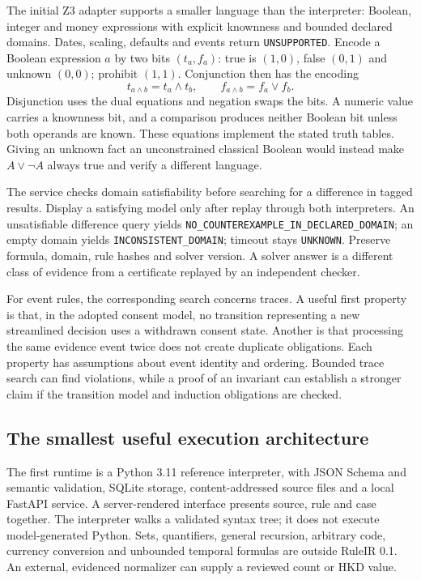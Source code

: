 The initial Z3 adapter supports a smaller language than the interpreter:
Boolean, integer and money expressions with explicit knownness and bounded
declared domains. Dates, scaling, defaults and events return
\texttt{UNSUPPORTED}. Encode a Boolean expression $a$ by two bits $(t_a,f_a)$:
true is $(1,0)$, false $(0,1)$ and unknown $(0,0)$; prohibit $(1,1)$.
Conjunction then has the encoding
\begin{equation}
 t_{a\land b}=t_a\land t_b,\qquad
 f_{a\land b}=f_a\lor f_b.
 \label{eq:knownness}
\end{equation}
Disjunction uses the dual equations and negation swaps the bits. A numeric value
carries a knownness bit, and a comparison produces neither Boolean bit unless
both operands are known. These equations implement the stated truth tables.
Giving an unknown fact an unconstrained classical Boolean would instead make
$A\lor\neg A$ always true and verify a different language.

The service checks domain satisfiability before searching for a difference in
tagged results. Display a satisfying model only after replay through both
interpreters. An unsatisfiable difference query yields
\texttt{NO\_COUNTEREXAMPLE\_IN\_DECLARED\_DOMAIN}; an empty domain yields
\texttt{INCONSISTENT\_DOMAIN}; timeout stays \texttt{UNKNOWN}. Preserve formula,
domain, rule hashes and solver version. A solver answer is a different class
of evidence from a certificate replayed by an independent checker.

For event rules, the corresponding search concerns traces. A useful first
property is that, in the adopted consent model, no transition representing a new
streamlined decision uses a withdrawn consent state. Another is that processing
the same evidence event twice does not create duplicate obligations. Each
property has assumptions about event identity and ordering. Bounded trace search
can find violations, while a proof of an invariant can establish a stronger
claim if the transition model and induction obligations are checked.

\subsection{The smallest useful execution architecture}

The first runtime is a Python 3.11 reference interpreter, with JSON Schema and
semantic validation, SQLite storage, content-addressed source files and a local
FastAPI service. A server-rendered interface presents source, rule and case
together. The interpreter walks a validated syntax tree; it does not execute
model-generated Python. Sets, quantifiers, general recursion, arbitrary code,
currency conversion and unbounded temporal formulas are outside RuleIR 0.1.
An external, evidenced normalizer can supply a reviewed count or HKD value.

